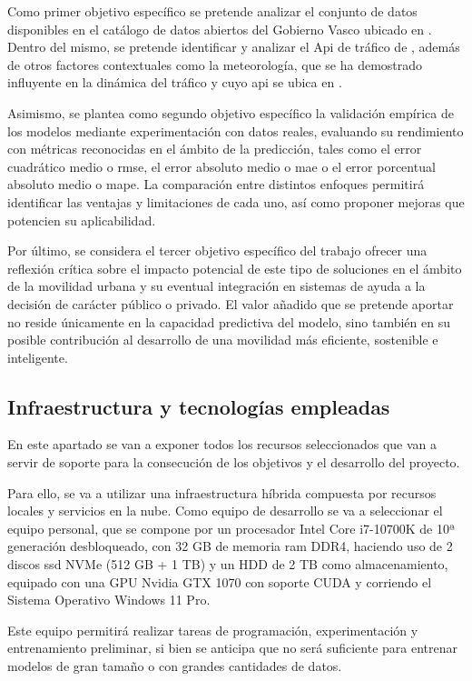 Como primer objetivo específico se pretende analizar el conjunto de datos disponibles en el catálogo de datos abiertos del Gobierno Vasco ubicado en \cite{openDataGv}. Dentro del mismo, se pretende identificar y analizar el Api de tráfico de \cite{apiTraffic}, además de otros factores contextuales como la meteorología, que se ha demostrado influyente en la dinámica del tráfico y cuyo \acrshort{api} se ubica en \cite{apiMeteo}.

Asimismo, se plantea como segundo objetivo específico la validación empírica de los modelos mediante experimentación con datos reales, evaluando su rendimiento con métricas reconocidas en el ámbito de la predicción, tales como el error cuadrático medio o \acrshort{rmse}, el error absoluto medio o \acrshort{mae} o el error porcentual absoluto medio o \acrshort{mape}. La comparación entre distintos enfoques permitirá identificar las ventajas y limitaciones de cada uno, así como proponer mejoras que potencien su aplicabilidad.

Por último, se considera el tercer objetivo específico del trabajo ofrecer una reflexión crítica sobre el impacto potencial de este tipo de soluciones en el ámbito de la movilidad urbana y su eventual integración en sistemas de ayuda a la decisión de carácter público o privado. El valor añadido que se pretende aportar no reside únicamente en la capacidad predictiva del modelo, sino también en su posible contribución al desarrollo de una movilidad más eficiente, sostenible e inteligente.

\subsection{Infraestructura y tecnologías empleadas}

En este apartado se van a exponer todos los recursos seleccionados que van a servir de soporte para la consecución de los objetivos y el desarrollo del proyecto.

Para ello, se va a utilizar una infraestructura híbrida compuesta por recursos locales y servicios en la nube.
Como equipo de desarrollo se va a seleccionar el equipo personal, que se compone por un procesador Intel Core i7-10700K de 10ª generación desbloqueado, con 32 GB de memoria \acrshort{ram} DDR4, haciendo uso de 2 discos \acrshort{ssd} NVMe (512 GB + 1 TB) y un HDD de 2 TB como almacenamiento, equipado con una GPU Nvidia GTX 1070 con soporte CUDA y corriendo el Sistema Operativo Windows 11 Pro.

Este equipo permitirá realizar tareas de programación, experimentación y entrenamiento preliminar, si bien se anticipa que no será suficiente para entrenar modelos de gran tamaño o con grandes cantidades de datos.

